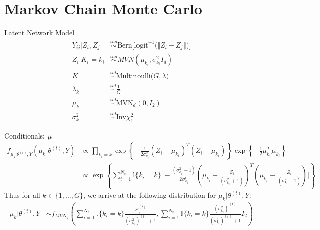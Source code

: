 \documentclass[handout]{beamer}
\begin{document}
%
%


\section{Markov Chain Monte Carlo}

\begin{frame}{Latent Network Model}
\begin{align*}
Y_{ij} | Z_i, Z_j &\overset{ind}\sim \text{Bern}\Big[\text{logit}^{-1}\big(\Vert Z_i - Z_j \Vert\big)\Big] \\
Z_i | K_i = k_i &\overset{ind}\sim MVN(\mu_{k_i}, \sigma_{k_i}^2 I_d) \\
K &\overset{iid}\sim \text{Multinoulli}\big(G, \lambda \big) \\
\lambda_k &\overset{iid}\sim \frac{1}{G} \\
\mu_k &\overset{iid}\sim \text{MVN}_d(0, I_2) \\
\sigma_k^2 &\overset{iid}\sim \text{Inv} \chi^2_1
\end{align*}
\end{frame}

\scriptsize
\begin{frame}{Conditionals: $\mu$}
\begin{align*}
f_{\mu_{k}|\theta^{(t)}, Y}(\mu_k|\theta^{(t)},Y) &\propto \prod_{k_i = k} \exp\left\{-\frac{1}{2\sigma_{k_i}^2}(Z_i - \mu_{k_i})^T(Z_i - \mu_{k_i})\right\}\exp\left\{-\frac{1}{2}\mu_{k_i}^T\mu_{k_i}\right\}\\
&\propto\exp\left\{\sum_{i = 1}^{N_v}\mathbb{I}\{k_i = k\} \Big[-\frac{(\sigma_{k_i}^2+1)}{2\sigma_{k_i}^t}\left(\mu_{k_i}-\frac{Z_i}{(\sigma_{k_i}^2+1)}\right)^T\left(\mu_{k_i}-\frac{Z_i}{(\sigma_{k_i}^2+1)}\right)\Big]\right\}
\end{align*}
Thus for all $k \in \{1, \ldots, G\}$, we arrive at the following distribution for $\mu_k | \theta^{(t)}, Y$:
\begin{align*}
\mu_{k}|\theta^{(t)},Y&\sim f_{{MVN}_d} \left(\sum_{i = 1}^{N_v}\mathbb{I}\{k_i = k\}\frac{Z_i^{(t)}}{(\sigma_{k_i}^2)^{(t)}+1}, \sum_{i = 1}^{N_v}\mathbb{I}\{k_i = k\}\frac{(\sigma_{k_i}^2)^{(t)}}{(\sigma_{k_i}^2)^{(t)}+1}I_2\right)\\
\end{align*}
\end{frame}
\end{document}
